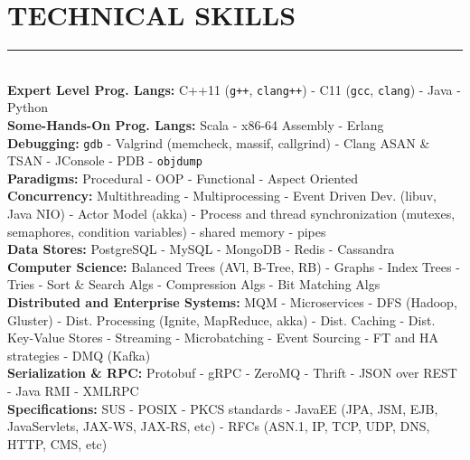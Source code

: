 \documentclass[10pt,a4paper]{article}
\begin{document}
\section{TECHNICAL SKILLS}
\noindent \rule {18.0cm}{0.2pt} \\
\noindent
\textbullet \hspace{0.1cm}\textbf{Expert Level Prog. Langs:} C++11 (\texttt{g++}, \texttt{clang++}) - C11 (\texttt{gcc}, \texttt{clang}) - Java - Python \\
\textbullet \hspace{0.1cm}\textbf{Some-Hands-On Prog. Langs:} Scala - x86-64 Assembly - Erlang \\
\textbullet \hspace{0.1cm}\textbf{Debugging:} \texttt{gdb} - Valgrind (memcheck, massif, callgrind) - Clang ASAN \& TSAN - JConsole - PDB - \texttt{objdump} \\
\textbullet \hspace{0.1cm}\textbf{Paradigms:} Procedural - OOP - Functional - Aspect Oriented\\
\textbullet \hspace{0.1cm}\textbf{Concurrency:} Multithreading - Multiprocessing - Event Driven Dev. (libuv, Java NIO) - Actor Model (akka) - Process and thread synchronization (mutexes, semaphores, condition variables) - shared memory - pipes \\
\textbullet \hspace{0.1cm}\textbf{Data Stores:} PostgreSQL - MySQL - MongoDB - Redis - Cassandra \\
\textbullet \hspace{0.1cm}\textbf{Computer Science:} Balanced Trees (AVl, B-Tree, RB) - Graphs - Index Trees - Tries - Sort \& Search Algs - Compression Algs - Bit Matching Algs  \\
\textbullet \hspace{0.1cm}\textbf{Distributed and Enterprise Systems:} MQM - Microservices - DFS (Hadoop, Gluster) - Dist. Processing (Ignite, MapReduce, akka) - Dist. Caching - Dist. Key-Value Stores - Streaming - Microbatching - Event Sourcing - FT and HA strategies - DMQ (Kafka)  \\
\textbullet \hspace{0.1cm}\textbf{Serialization \& RPC:} Protobuf - gRPC - ZeroMQ - Thrift - JSON over REST - Java RMI - XMLRPC \\
\textbullet \hspace{0.1cm}\textbf{Specifications:} SUS - POSIX - PKCS standards - JavaEE (JPA, JSM, EJB, JavaServlets, JAX-WS, JAX-RS, etc) - RFCs (ASN.1, IP, TCP, UDP, DNS, HTTP, CMS, etc) \\
\end{document}
